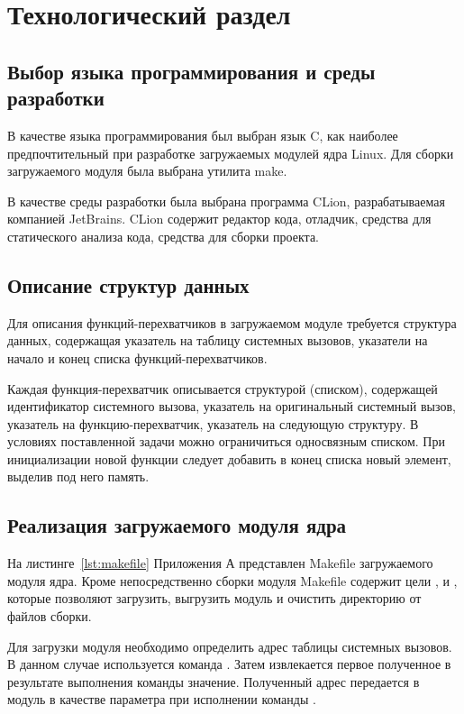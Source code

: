 \chapter{Технологический раздел}

\section{Выбор языка программирования и среды разработки}

В качестве языка программирования был выбран язык C, как наиболее предпочтительный при разработке загружаемых модулей ядра Linux. Для сборки загружаемого модуля была выбрана утилита make.

В качестве среды разработки была выбрана программа CLion, разрабатываемая компанией JetBrains. CLion содержит редактор кода, отладчик, средства для статического анализа кода, средства для сборки проекта.

\section{Описание структур данных}

Для описания функций-перехватчиков в загружаемом модуле требуется структура данных, содержащая указатель на таблицу системных вызовов, указатели на начало и конец списка функций-перехватчиков.

Каждая функция-перехватчик описывается структурой (списком), содержащей идентификатор системного вызова, указатель на оригинальный системный вызов, указатель на функцию-перехватчик, указатель на следующую структуру. В условиях поставленной задачи можно ограничиться односвязным списком. При инициализации новой функции следует добавить в конец списка новый элемент, выделив под него память.

\section{Реализация загружаемого модуля ядра}

На листинге~\ref{lst:makefile} Приложения А представлен Makefile загружаемого модуля ядра. Кроме непосредственно сборки модуля Makefile содержит цели ,  и , которые позволяют загрузить, выгрузить модуль и очистить директорию от файлов сборки.

Для загрузки модуля необходимо определить адрес таблицы системных вызовов. В данном случае используется команда . Затем извлекается первое полученное в результате выполнения команды значение. Полученный адрес передается в модуль в качестве параметра  при исполнении команды .

